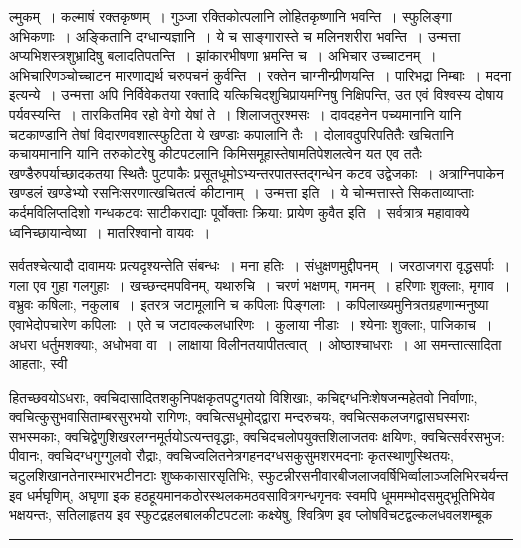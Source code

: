 \documentclass[11pt, openany]{book}
\begin{document}
\noindent
{\s ल्मुकम्~। कल्माषं रक्तकृष्णम्~। गुञ्जा रक्तिकोत्पलानि लोहितकृष्णानि भवन्ति~। स्फुलिङ्गा अभिकणाः~। अङ्कितानि दग्धान्यज्ञानि~। ये च साङ्गारास्ते च मलिनशरीरा भवन्ति~। उन्मत्ता अप्यभिशस्त्रशुभ्रादिषु बलादतिपतन्ति~। झांकारभीषणा भ्रमन्ति च~। अभिचार उच्चाटनम्~। अभिचारिणञ्चोच्चाटन मारणाद्यर्थ चरुपचनं कुर्वन्ति~। रक्तेन चाग्नीन्प्रीणयन्ति~। पारिभद्रा निम्बाः~। मदना इत्यन्ये~। उन्मत्ता अपि निर्विवेकतया रक्तादि यत्किचिदशुचिप्रायमग्निषु निक्षिपन्ति, उत एवं विश्वस्य दोषाय पर्यवस्यन्ति~। तारकितमिव रहो वेगो येषां ते~। शिलाजतुरश्मसः~। दावदहनेन पच्यमानानि यानि चटकाण्डानि तेषां विदारणवशात्स्फुटिता ये खण्डाः कपालानि तैः~। दोलावदुपरिपतितैः खचितानि कचायमानानि यानि तरुकोटरेषु कीटपटलानि किमिसमूहास्तेषामतिपेशलत्वेन यत एव ततैः खण्डैरुपर्याच्छादकतया स्थितैः पुटपाकैः प्रसूतधूमोऽभ्यन्तरपातस्तद्गन्धेन कटव उद्वेजकाः~। अत्राग्निपाकेन खण्डलं खण्डेभ्यो रसनिःसरणात्खचितत्वं कीटानाम्~। {\qtt उन्मत्ता इति}~। ये चोन्मत्तास्ते सिकताव्याप्ताः कर्दमविलिप्तदिशो गन्धकटवः साटीकराद्याः पूर्वोक्ताः क्रिया: प्रायेण कुवैत इति~। सर्वत्रात्र महावाक्ये ध्वनिच्छायान्वेष्या~। मातरिश्वानो वायवः~। 

सर्वतश्चेत्यादौ दावामयः प्रत्यदृश्यन्तेति संबन्धः~। मना हतिः~। संधुक्षणमुद्दीपनम्~। जरठाजगरा वृद्धसर्पाः~। गला एव गुहा गलगुहाः~। खच्छन्दमपविनम्, यथारुचि~। चरणं भक्षणम्, गमनम्~। हरिणाः शुक्लाः, मृगाव~। वभ्रुवः कषिलाः, नकुलाब~। इतरत्र जटामूलानि च कपिलाः पिङ्गलाः~। कपिलाख्यमुनित्रतग्रहणान्मनुष्या एवाभेदोपचारेण कपिलाः~। एते च जटावल्कलधारिणः~। कुलाया नीडाः~। श्येनाः शुक्लाः, पाजिकाच~। अधरा धर्तुमशक्याः, अधोभवा वा~। लाक्षाया विलीनतयापीतत्वात्~। ओष्ठाश्चाधराः~। आ समन्तात्सादिता आहताः, स्वी\textendash}

\newpage

\noindent
हितच्छवयोऽधराः, क्वचिदासादितशकुनिपक्षकृतपटुगतयो विशिखाः, कचिद्दग्धनिःशेषजन्महेतवो निर्वाणाः, क्वचित्कुसुभवासिताम्बरसुरभयो रागिणः, क्वचित्सधूमोद्द्वारा मन्दरुचयः, क्वचित्सकलजगद्वासघस्मराः सभस्मकाः, क्वचिद्वेणुशिखरलग्नमूर्तयोऽत्यन्तवृद्धाः, क्वचिदचलोपयुक्तशिलाजतवः क्षयिणः, क्वचित्सर्वरसभुज: पीवानः, क्वचिदग्धगुग्गुलवो रौद्राः, क्वचिज्वलितनेत्रगहनदग्धसकुसुमशरमदनाः कृतस्थाणुस्थितयः, चटुलशिखानतेनारम्भारभटीनटाः शुष्ककासारसृतिभिः, स्फुटन्नीरसनीवारबीजलाजवर्षिभिर्व्वालाञ्जलिभिरचर्यन्त इव धर्मघृणिम्, अघृणा इक हठहूयमानकठोरस्थलकमठवसावित्रगन्धगृनवः स्वमपि धूममम्भोदसमुद्भूतिभियेव भक्षयन्तः, सतिलाहृतय इव स्फुटद्रहलबालकीटपटलाः कक्ष्येषु, श्वित्रिण इव प्लोषविचटद्वल्कलधवलशम्बूक\textendash

\vspace{2mm}
\hrule
\end{document}
